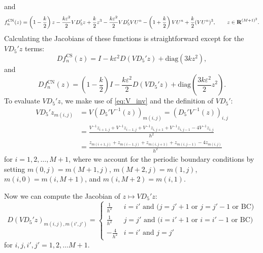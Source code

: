 \documentclass{article}
\begin{document}
	and
	\begin{equation*}
		f^\text{CN}_n(z) = \left(1-\frac{k}{2}\right)z - \frac{k\varepsilon^2}{2}VD_5'z + \frac{k}{2}z^3 - \frac{k\varepsilon^2}{2}VD_5'VU^n -\left(1+\frac{k}{2}\right)VU^n + \frac{k}{2}(VU^n)^3, \qquad z \in \textnormal{\bf R}^{(M+1)^2}.
	\end{equation*}
	Calculating the Jacobians of these functions is straightforward except for the $VD_5'z$ terms:
	\begin{equation*}
		Df^\text{CS}_n(z) = I - k\varepsilon^2D(VD_5'z) + \mathrm{diag}(3kz^2),
	\end{equation*}
	and
	\begin{equation*}
		Df^\text{CN}_n(z) = \left(1-\frac{k}{2}\right)I - \frac{k\varepsilon^2}{2}D(VD_5'z) + \mathrm{diag}\left(\frac{3k\varepsilon^2}{2}z^2\right).
	\end{equation*}
	To evaluate $VD_5'z$, we make use of \eqref{eq:V_inv} and the definition of $VD_5'$:
	\begin{align*}
		VD_5'z_{m(i,j)} &= V(D_5'V^{-1}(z))_{m(i,j)} = (D_5'V^{-1}(z))_{i,j} \\
		&= \frac{V^{-1}z_{i+1,j} + V^{-1}z_{i-1,j} + V^{-1}z_{i,j+1} +V^{-1}z_{i,j-1} - 4V^{-1}z_{i,j}}{h^2} \\
		&= \frac{z_{m(i+1,j)} + z_{m(i-1,j)} + z_{m(i,j+1)} + z_{m(i,j-1)} - 4z_{m(i,j)}}{h^2}
	\end{align*}
	for $i = 1,2,\dots, M+1$, where we account for the periodic boundary conditions by setting $m(0,j) = m(M+1,j)$, $m(M+2,j) = m(1,j)$, $m(i,0) = m(i,M+1)$, and $m(i,M+2) = m(i,1)$.
	
	Now we can compute the Jacobian of $z \mapsto VD_5'z$:
	\begin{equation*}
		D(VD_5'z)_{m(i,j), m(i',j')} = \begin{cases}
			\frac{1}{h^2} & i = i' \text{ and } \big(j = j' + 1 \text{ or } j = j'-1 \text{ or BC}\big) \\
			\frac{1}{h^2} & j = j' \text{ and } \big(i = i' + 1 \text{ or } i = i'-1 \text{ or BC}\big) \\
			-\frac{4}{h^2} & i = i' \text{ and } j = j'
		\end{cases}
	\end{equation*}
	for $i,j,i',j' = 1,2,\dots M + 1$.
	
	
	
\end{document}
